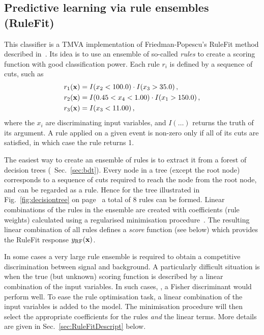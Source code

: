 \subsection{Predictive learning via rule ensembles (RuleFit)}
\label{sec:rulefit}

This classifier is a TMVA implementation of Friedman-Popescu's RuleFit
method described in~\cite{RuleFit}. Its idea is to use an 
ensemble of so-called {\em rules} to create 
a scoring function with good classification power. Each rule $r_i$ is defined by a 
sequence 
of cuts, such as
\begin{align*}
r_1({\bf x}) & = I(x_2<100.0) \cdot I(x_3>35.0)\,,\\
r_2({\bf x}) & = I(0.45<x_4<1.00) \cdot I(x_1>150.0)\,,\\
r_3({\bf x}) & = I(x_3<11.00)\,,
\end{align*}
where the $x_i$ are discriminating input variables, and $I(\dots)$ returns the truth of 
its argument. A rule applied on a given event is non-zero only if all of its cuts are 
satisfied, in which case the rule returns 1.

The easiest way to create an ensemble of rules is to extract it from a forest 
of decision trees (\cf\  Sec.~\ref{sec:bdt}). Every node in a tree (except the root node) 
corresponds to a sequence of cuts required to reach the node from the root node, 
and can be regarded as a rule.  Hence for the tree illustrated in 
Fig.~\ref{fig:decisiontree} on page~\pageref{fig:decisiontree} 
a total of 8 rules can be formed. Linear combinations of the 
rules in the ensemble are created with coefficients (rule weights) calculated using a 
regularised minimisation procedure~\cite{RuleFitMin}. The resulting linear combination 
of all rules defines a {\em score} function (see below) which provides the RuleFit 
response $ y_{\rm RF}({\bf x})$. 

In some cases a very large rule ensemble is required to obtain a competitive 
discrimination between signal and background. A particularly difficult situation 
is when the true (but unknown) scoring function is described by a linear 
combination of the input variables. 
In such cases, \eg, a Fisher discriminant
would perform well. To ease the rule optimisation task, a linear combination of the 
input variables is added to the model. The minimisation procedure will then select the 
appropriate coefficients for the rules {\em and} the linear terms. More details are given in 
Sec.~\ref{sec:RuleFitDescript} below.

